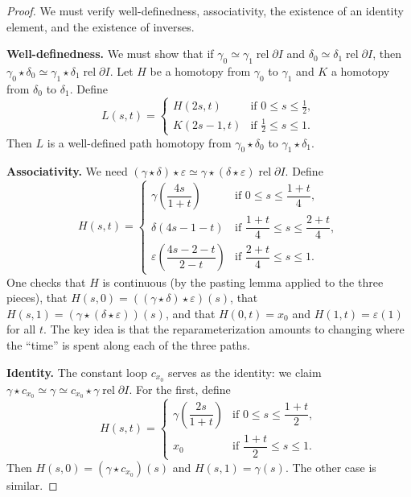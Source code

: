 \documentclass[12pt,a4paper,openany]{book}
\theoremstyle{definition}
\theoremstyle{plain}
\theoremstyle{remark}
\newcommand{\rel}{\operatorname{rel}}
\begin{document}
\begin{proof}
We must verify well-definedness, associativity, the existence of an identity
element, and the existence of inverses.

\textbf{Well-definedness.} We must show that if $\gamma_0 \simeq \gamma_1
\rel{\partial I}$ and $\delta_0 \simeq \delta_1 \rel{\partial I}$, then
$\gamma_0 \star \delta_0 \simeq \gamma_1 \star \delta_1 \rel{\partial I}$. Let
$H$ be a homotopy from $\gamma_0$ to $\gamma_1$ and $K$ a homotopy from
$\delta_0$ to $\delta_1$. Define
\[
  L(s, t) = \begin{cases}
    H(2s, t) & \text{if } 0 \le s \le \tfrac{1}{2}, \\
    K(2s-1, t) & \text{if } \tfrac{1}{2} \le s \le 1.
  \end{cases}
\]
Then $L$ is a well-defined path homotopy from $\gamma_0 \star \delta_0$ to
$\gamma_1 \star \delta_1$.

\textbf{Associativity.} We need $(\gamma \star \delta) \star \varepsilon \simeq
\gamma \star (\delta \star \varepsilon) \rel{\partial I}$. Define
\[
  H(s, t) = \begin{cases}
    \gamma\!\left(\dfrac{4s}{1+t}\right) & \text{if } 0 \le s \le \dfrac{1+t}{4}, \\[8pt]
    \delta(4s - 1 - t) & \text{if } \dfrac{1+t}{4} \le s \le \dfrac{2+t}{4}, \\[8pt]
    \varepsilon\!\left(\dfrac{4s - 2 - t}{2 - t}\right) & \text{if } \dfrac{2+t}{4} \le s \le 1.
  \end{cases}
\]
One checks that $H$ is continuous (by the pasting lemma applied to the three
pieces), that $H(s,0) = ((\gamma \star \delta) \star \varepsilon)(s)$, that
$H(s,1) = (\gamma \star (\delta \star \varepsilon))(s)$, and that $H(0,t) =
x_0$ and $H(1,t) = \varepsilon(1)$ for all $t$. The key idea is that the
reparameterization amounts to changing where the ``time'' is spent along each of
the three paths.

\textbf{Identity.} The constant loop $c_{x_0}$ serves as the identity: we claim
$\gamma \star c_{x_0} \simeq \gamma \simeq c_{x_0} \star \gamma \rel{\partial
I}$. For the first, define
\[
  H(s, t) = \begin{cases}
    \gamma\!\left(\dfrac{2s}{1+t}\right) & \text{if } 0 \le s \le \dfrac{1+t}{2}, \\[6pt]
    x_0 & \text{if } \dfrac{1+t}{2} \le s \le 1.
  \end{cases}
\]
Then $H(s,0) = (\gamma \star c_{x_0})(s)$ and $H(s,1) = \gamma(s)$. The other
case is similar.


\end{proof}
\end{document}
